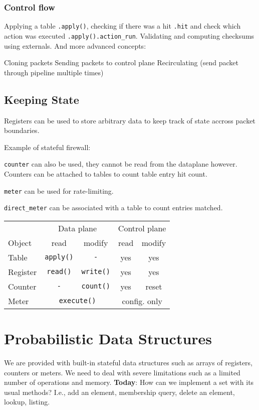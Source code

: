 \documentclass[a4paper, fontsize=8pt, landscape, DIV=1]{scrartcl}
\begin{document}
\begin{multicols*}{4}
  \subsubsection{Control flow}
  Applying a table \texttt{.apply()}, checking if there was a hit \texttt{.hit} and check which action was executed \texttt{.apply().action\_run}. Validating and computing checksums
  using externals. And more advanced concepts:
  \begin{outline}
   \1 Cloning packets
   \1 Sending packets to control plane
   \1 Recirculating (send packet through pipeline multiple times)
  \end{outline}

  \subsection{Keeping State}
  Registers can be used to store arbitrary data to keep track of state accross
  packet boundaries.

  Example of stateful firewall:

  \texttt{counter} can also be used, they cannot be read from the dataplane however.
  Counters can be attached to tables to count table entry hit count.

  \texttt{meter} can be used for rate-limiting. 

  \texttt{direct\_meter} can be associated with a table to count entries matched.

  \begin{tabularx}{\linewidth}{l c c c c}
    \\ \hline
    {} & \multicolumn{2}{c}{Data plane} & \multicolumn{2}{c}{Control plane} \\ 
    Object & read & modify & read & modify \\
    \hline
    Table & \texttt{apply()} & \texttt{-} & yes & yes \\
    Register & \texttt{read()} & \texttt{write()} & yes & yes \\
    Counter & \texttt{-} & \texttt{count()} & yes & reset \\
    Meter & \multicolumn{2}{c}{\texttt{execute()}} & \multicolumn{2}{c}{config. only}
  \end{tabularx}


  \section{Probabilistic Data Structures}
  We are provided with built-in stateful data structures such as arrays of registers, 
  counters or meters. We need to deal with severe limitations such as a limited
  number of operations and memory. \textbf{Today}: How can we implement a set with
  its usual methods? I.e., add an element, membership query, delete an element,
  lookup, listing.


\end{multicols*}
\end{document}
